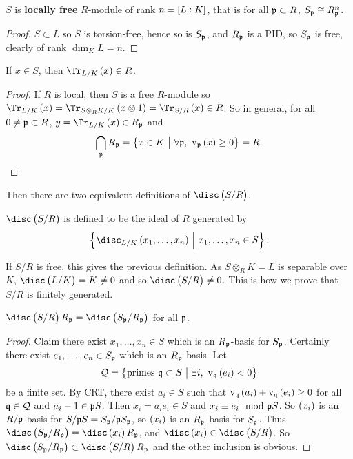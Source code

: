 \begin{proposition}
$ S $ is \textbf{locally free} $ R $-module of rank $ n = \sbr{L : K} $, that is for all $ \mathfrak{p} \subset R $, $ S_{\mathfrak{p}} \cong R_{\mathfrak{p}}^n $.
\end{proposition}

\begin{proof}
$ S \subset L $ so $ S $ is torsion-free, hence so is $ S_{\mathfrak{p}} $, and $ R_{\mathfrak{p}} $ is a PID, so $ S_{\mathfrak{p}} $ is free, clearly of rank $ \dim_K L = n $.
\end{proof}

\pagebreak

\begin{lemma}
If $ x \in S $, then $ \Tr_{L / K}\br{x} \in R $.
\end{lemma}

\begin{proof}
If $ R $ is local, then $ S $ is a free $ R $-module so $ \Tr_{L / K}\br{x} = \Tr_{S \otimes_R K / K}\br{x \otimes 1} = \Tr_{S / R}\br{x} \in R $. So in general, for all $ 0 \ne \mathfrak{p} \subset R $, $ y = \Tr_{L / K}\br{x} \in R_\ppp $ and
$$ \bigcap_\ppp R_\ppp = \cbr{x \in K \st \forall \ppp, \ \v_\ppp\br{x} \ge 0} = R. $$
\end{proof}

Then there are two equivalent definitions of $ \disc\br{S / R} $.

\begin{definition*}
$ \disc\br{S / R} $ is defined to be the ideal of $ R $ generated by
$$ \cbr{\disc_{L / K} \br{x_1, \dots, x_n} \st x_1, \dots, x_n \in S}. $$
\end{definition*}

If $ S / R $ is free, this gives the previous definition. As $ S \otimes_R K = L $ is separable over $ K $, $ \disc\br{L / K} = K \ne 0 $ and so $ \disc\br{S / R} \ne 0 $. This is how we prove that $ S / R $ is finitely generated.

\begin{proposition}
\label{prop:3.4}
$ \disc\br{S / R}R_\ppp = \disc\br{S_\ppp / R_\ppp} $ for all $ \mathfrak{p} $.
\end{proposition}

\begin{proof}
Claim there exist $ x_1, \dots, x_n \in S $ which is an $ R_{\mathfrak{p}} $-basis for $ S_{\mathfrak{p}} $. Certainly there exist $ e_1, \dots, e_n \in S_{\mathfrak{p}} $ which is an $ R_{\mathfrak{p}} $-basis. Let
$$ \QQQ = \cbr{\text{primes} \ \qqq \subset S \st \exists i, \ \v_\qqq\br{e_i} < 0} $$
be a finite set. By CRT, there exist $ a_i \in S $ such that $ \v_\qqq\br{a_i} + \v_\qqq\br{e_i} \ge 0 $ for all $ \mathfrak{q} \in \mathcal{Q} $ and $ a_i - 1 \in \mathfrak{p} S $. Then $ x_i = a_ie_i \in S $ and $ x_i \equiv e_i \mod {\mathfrak{p}} S $. So $ \br{x_i} $ is an $ R / \mathfrak{p} $-basis for $ S / \mathfrak{p} S = S_{\mathfrak{p}} / \mathfrak{p} S_{\mathfrak{p}} $, so $ \br{x_i} $ is an $ R_{\mathfrak{p}} $-basis for $ S_{\mathfrak{p}} $. Thus $ \disc\br{S_\ppp / R_\ppp} = \disc \br{x_i}R_\ppp $, and $ \disc \br{x_i} \in \disc\br{S / R} $. So $ \disc \br{S_\ppp / R_\ppp} \subset \disc\br{S / R}R_\ppp $ and the other inclusion is obvious.
\end{proof}

